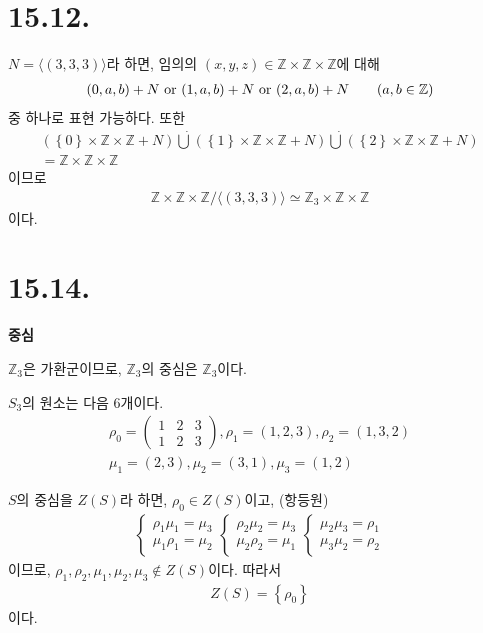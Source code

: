 \documentclass{article}
\begin{document}
\section{15.12.}
$N = \langle (3, 3, 3) \rangle$라 하면, 임의의 $(x, y, z) \in \mathbb{Z} \times \mathbb{Z} \times \mathbb{Z}$에 대해
\begin{align*}
(0, a, b) + N \text{ or } (1, a, b) + N \text{ or } (2, a, b) + N \tag{$a, b \in \mathbb{Z}$}
\end{align*}중 하나로 표현 가능하다. 또한
\begin{align*}
(\left\{0\right\} \times \mathbb{Z} \times \mathbb{Z}  + N) \dot{\bigcup} (\left\{1\right\} \times \mathbb{Z} \times \mathbb{Z}  + N) \dot{\bigcup} (\left\{2\right\} \times \mathbb{Z} \times \mathbb{Z}  + N) 
\\= \mathbb{Z} \times \mathbb{Z} \times \mathbb{Z}
\end{align*}이므로
\begin{align*}
\mathbb{Z} \times \mathbb{Z} \times \mathbb{Z} / \langle (3, 3, 3) \rangle \simeq \mathbb{Z}_3 \times \mathbb{Z} \times \mathbb{Z}
\end{align*}이다.

\section{15.14.}
\textbf{중심}

$\mathbb{Z}_3$은 가환군이므로, $\mathbb{Z}_3$의 중심은 $\mathbb{Z}_3$이다.

$S_3$의 원소는 다음 $6$개이다. 
\begin{align*}
\rho_0 = \begin{pmatrix}
1&2  &3 \\ 
1& 2 & 3
\end{pmatrix}, \rho_1 = (1, 2, 3), \rho_2 = (1, 3, 2)
\\ \mu_1 = (2, 3), \mu_2 = (3, 1), \mu_3 = (1, 2)
\end{align*}

$S$의 중심을 $Z(S)$라 하면,  $\rho_0 \in Z(S)$이고, (항등원)
\begin{align*}
\left\{\begin{matrix}
\rho_1 \mu_1 = \mu_3
\\ \mu_1 \rho_1 = \mu_2
\end{matrix}\right.
\left\{\begin{matrix}
\rho_2 \mu_2 = \mu_3
\\ \mu_2 \rho_2 = \mu_1
\end{matrix}\right.
\left\{\begin{matrix}
\mu_2 \mu_3 = \rho_1
\\ \mu_3 \mu_2 = \rho_2
\end{matrix}\right.
\end{align*}이므로, $\rho_1, \rho_2, \mu_1, \mu_2, \mu_3 \notin Z(S)$이다. 따라서
\begin{align*}
Z(S) = \left\{\rho_0 \right\}
\end{align*} 이다.
\end{document}
